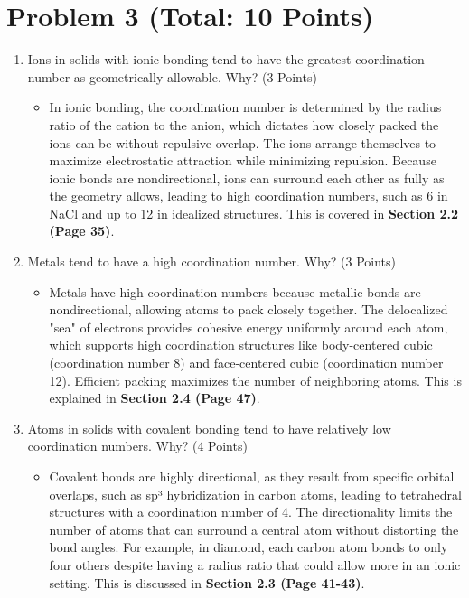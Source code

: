 \documentclass{article}
\begin{document}
\newpage
\section*{Problem 3 (Total: 10 Points)}
\begin{enumerate}
	\item[(a)] Ions in solids with ionic bonding tend to have the greatest coordination number as geometrically allowable. Why? (3 Points)
	      \begin{itemize}
	      	\item In ionic bonding, the coordination number is determined by the radius ratio of the cation to the anion, which dictates how closely packed the ions can be without repulsive overlap. The ions arrange themselves to maximize electrostatic attraction while minimizing repulsion. Because ionic bonds are nondirectional, ions can surround each other as fully as the geometry allows, leading to high coordination numbers, such as 6 in NaCl and up to 12 in idealized structures. This is covered in \textbf{Section 2.2 (Page 35)}.
	      \end{itemize}
	      
	\item[(b)] Metals tend to have a high coordination number. Why? (3 Points)
	      \begin{itemize}
	      	\item Metals have high coordination numbers because metallic bonds are nondirectional, allowing atoms to pack closely together. The delocalized "sea" of electrons provides cohesive energy uniformly around each atom, which supports high coordination structures like body-centered cubic (coordination number 8) and face-centered cubic (coordination number 12). Efficient packing maximizes the number of neighboring atoms. This is explained in \textbf{Section 2.4 (Page 47)}.
	      \end{itemize}
	      
	\item[(c)] Atoms in solids with covalent bonding tend to have relatively low coordination numbers. Why? (4 Points)
	      \begin{itemize}
	      	\item Covalent bonds are highly directional, as they result from specific orbital overlaps, such as sp³ hybridization in carbon atoms, leading to tetrahedral structures with a coordination number of 4. The directionality limits the number of atoms that can surround a central atom without distorting the bond angles. For example, in diamond, each carbon atom bonds to only four others despite having a radius ratio that could allow more in an ionic setting. This is discussed in \textbf{Section 2.3 (Page 41-43)}.
	      \end{itemize}
	      
\end{enumerate}
\end{document}
